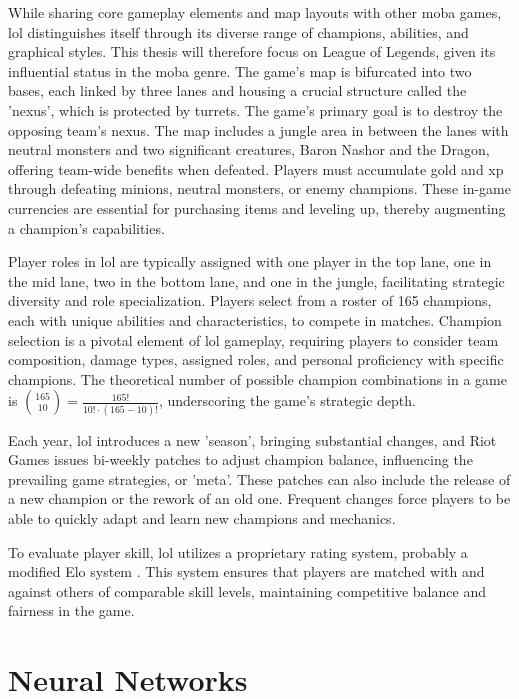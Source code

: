 \documentclass[12pt, a4paper, headinclude, twoside, plainheadsepline, open=right, numbers=noenddot, hidelinks, toc=listof, toc=bibliography]{scrreprt}
\begin{document}
While sharing core gameplay elements and map layouts with other \ac{moba} games, \ac{lol} distinguishes itself through its diverse range of champions, abilities, and graphical styles. 
This thesis will therefore focus on League of Legends, given its influential status in the \ac{moba} genre. 
The game's map is bifurcated into two bases, each linked by three lanes and housing a crucial structure called the 'nexus', which is protected by turrets. 
The game's primary goal is to destroy the opposing team's nexus.
The map includes a jungle area in between the lanes with neutral monsters and two significant creatures, Baron Nashor and the Dragon, offering team-wide benefits when defeated.
Players must accumulate gold and \ac{xp} through defeating minions, neutral monsters, or enemy champions. 
These in-game currencies are essential for purchasing items and leveling up, thereby augmenting a champion's capabilities.

Player roles in \ac{lol} are typically assigned with one player in the top lane, one in the mid lane, two in the bottom lane, and one in the jungle, facilitating strategic diversity and role specialization.
Players select from a roster of 165 champions, each with unique abilities and characteristics, to compete in matches.
Champion selection is a pivotal element of \ac{lol} gameplay, requiring players to consider team composition, damage types, assigned roles, and personal proficiency with specific champions. 
The theoretical number of possible champion combinations in a game is $\binom{165}{10} = \frac{165!}{10! \cdot (165-10)!}$, underscoring the game's strategic depth.

Each year, \ac{lol} introduces a new 'season', bringing substantial changes, and Riot Games issues bi-weekly patches to adjust champion balance, influencing the prevailing game strategies, or 'meta'.
These patches can also include the release of a new champion or the rework of an old one.
Frequent changes force players to be able to quickly adapt and learn new champions and mechanics.

To evaluate player skill, \ac{lol} utilizes a proprietary rating system, probably a modified Elo system \cite{janssonNeuralNetworksStandardizing2022}.
This system ensures that players are matched with and against others of comparable skill levels, maintaining competitive balance and fairness in the game.


\section{Neural Networks}
\label{sec:nn}
\end{document}
